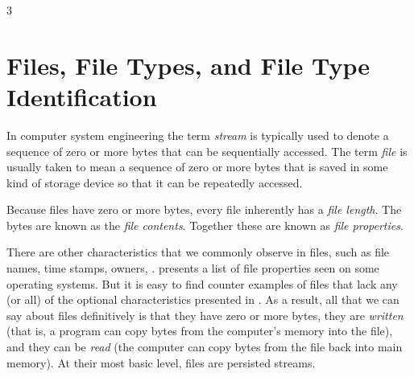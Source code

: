 \documentclass[11pt,letter]{article}
\begin{document}
      3
\setcounter{chapter}{3}
\chapter{Files, File Types, and File Type Identification}

In computer system engineering the term \emph{stream} is typically
used to denote a sequence of zero or more bytes that can be
sequentially accessed. The term \emph{file} is usually taken to mean a
sequence of zero or more bytes that is saved in some kind of storage
device so that it can be repeatedly accessed. 

Because files have zero or more bytes, every file inherently has a
\emph{file length}. The bytes are known as the \emph{file contents}. Together these are known as \emph{file
  properties}. 

There are other characteristics that we
commonly observe in files, such as file names, time stamps, owners,
\etc.   presents a list of file
properties seen on some operating systems. But it is easy to find counter examples of files that lack any
(or all) of the optional characteristics presented in
. As a result, all that we
can say about files definitively is that they have zero or more bytes,
they are \emph{written} (that is, a program can copy bytes from
the computer's memory into the file), and they can be \emph{read}
(the computer can copy bytes from the file back into main memory). At
their most basic level, files are persisted streams. 
\end{document}
